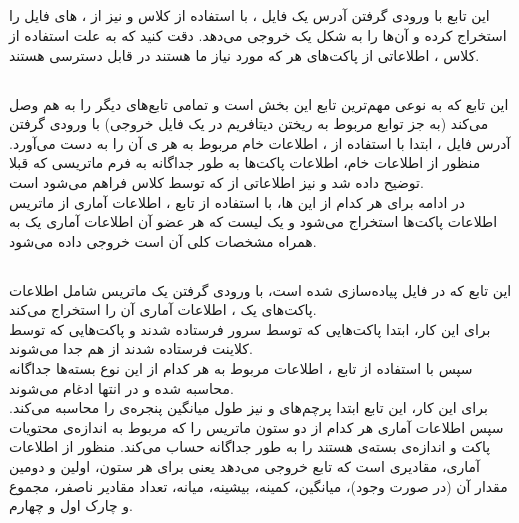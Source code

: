 \subsection{}
این تابع با ورودی گرفتن آدرس یک فایل ، با استفاده از کلاس  و نیز 
 از 
،
‌های
فایل را استخراج کرده و آن‌ها را به شکل یک  خروجی می‌دهد. دقت کنید که به علت استفاده از کلاس
 ،
 اطلاعاتی از پاکت‌های هر  که مورد نیاز ما هستند در 
قابل دسترسی هستند.\\
\subsection{}
این تابع که به نوعی مهم‌ترین تابع این بخش است و تمامی تابع‌های دیگر را به هم وصل می‌کند (به جز توابع مربوط به ریختن دیتافریم در یک فایل خروجی) با ورودی گرفتن  آدرس فایل
،
ابتدا با استفاده از 
،
اطلاعات خام مربوط به هر 
ی
آن را به دست می‌آورد. منظور از اطلاعات خام، اطلاعات پاکت‌ها به طور جداگانه به فرم ماتریسی که قبلا توضیح داده شد و نیز اطلاعاتی از  که توسط کلاس  فراهم می‌شود است.\\
در ادامه برای هر کدام از این ‌ها، با استفاده از تابع 
،
اطلاعات آماری  از ماتریس اطلاعات پاکت‌ها استخراج می‌شود و یک لیست که هر عضو آن اطلاعات آماری یک  به همراه مشخصات کلی آن است خروجی داده می‌شود.\\
\subsection{}
این تابع که در فایل
پیاده‌سازی شده است، با ورودی گرفتن یک ماتریس شامل اطلاعات پاکت‌های یک ، اطلاعات آماری آن را استخراج می‌کند.\\
برای این کار، ابتدا پاکت‌هایی که توسط سرور فرستاده شدند و پاکت‌هایی که توسط کلاینت فرستاده شدند از هم جدا می‌شوند.\\
سپس با استفاده از تابع
،
اطلاعات مربوط به هر کدام از این نوع بسته‌ها جداگانه محاسبه شده و در انتها ادغام می‌شوند.\\
برای این کار، این تابع ابتدا پرچم‌های  و نیز طول میانگین پنجره‌ی  را محاسبه می‌کند. سپس اطلاعات آماری هر کدام از دو ستون‌ ماتریس را که مربوط به اندازه‌ی محتویات پاکت و اندازه‌ی بسته‌ی  هستند را به طور جداگانه حساب می‌کند. منظور از اطلاعات آماری، مقادیری است که تابع 
خروجی می‌دهد یعنی برای هر ستون، اولین و دومین مقدار آن (در صورت وجود)، میانگین، کمینه، بیشینه، میانه، تعداد مقادیر ناصفر، مجموع و چارک اول و چهارم.\\
